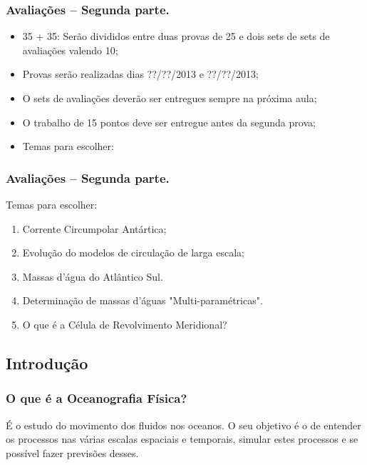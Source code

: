 \documentclass[14pt,xcolor=dvipsnames]{beamer}
\begin{document}
\begin{frame}
    \frametitle{Avaliações -- Segunda parte.}
    \begin{itemize}[<+-| alert@+>]
        \item 35 + 35: Serão divididos entre duas provas de 25 e dois sets de sets de avaliações valendo 10;
        \item Provas serão realizadas dias ??/??/2013 e ??/??/2013;
        \item O sets de avaliações deverão ser entregues sempre na próxima aula;
        \item O trabalho de 15 pontos deve ser entregue antes da segunda prova;
        \item Temas para escolher:
    \end{itemize}
\end{frame}

\begin{frame}
    \frametitle{Avaliações -- Segunda parte.}
        \begin{block}{}
        Temas para escolher:
        \end{block}
            {\scriptsize
            \begin{enumerate}[<+-| alert@+>]
                \item Corrente Circumpolar Antártica;
                \item Evolução do modelos de circulação de larga escala;
                \item Massas d'água do Atlântico Sul.
                \item Determinação de massas d'águas "Multi-paramétricas".
                \item O que é a Célula de Revolvimento Meridional?
            \end{enumerate}
            }
\end{frame}

\subsection{Introdução}
\begin{frame}
    \frametitle{O que é a Oceanografia Física?}
    \begin{block}{}
        É o estudo do movimento dos fluidos nos oceanos.  O seu objetivo é o de
        entender os processos nas várias escalas espaciais e temporais, simular
        estes processos e se possível fazer previsões desses.
    \end{block}
\end{frame}
\end{document}
